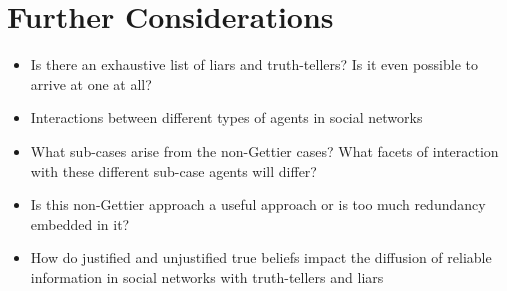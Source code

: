 \documentclass[12pt, titlepage, twoside, a4paper]{report}
\begin{document}
\section{Further Considerations}

\begin{itemize}
\item Is there an exhaustive list of liars and truth-tellers? Is it even possible to arrive at one at all?
\item Interactions between different types of agents in social networks
\item What sub-cases arise from the non-Gettier cases? What facets of interaction with these different sub-case agents will differ?
\item Is this non-Gettier approach a useful approach or is too much redundancy embedded in it?
\item How do justified and unjustified true beliefs impact the diffusion of reliable information in social networks with truth-tellers and liars
\end{itemize}

\printbibliography
\end{document}
